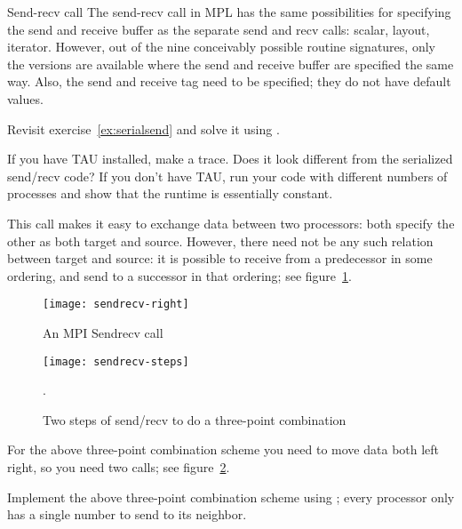\begin{mplnote}{Send-recv call}
  The send-recv call in \ac{MPL} has the same possibilities
  for specifying the send and receive buffer as the separate send and recv calls:
  scalar, layout, iterator. However, out of the nine conceivably possible
  routine signatures, only the versions are available where the send and receive buffer
  are specified the same way.
  Also, the send and receive tag need to be specified; they do not have default values.

\end{mplnote}

\begin{exercise}
  \label{ex:rightsendrecv}
  Revisit exercise~\ref{ex:serialsend} and solve it using
  .

  If you have TAU installed, make a trace. Does it look different
  from the serialized send/recv code? If you don't have TAU, run your
  code with different numbers of processes and show that the runtime
  is essentially constant.
\end{exercise}

This call makes it easy to exchange data between two processors: both
specify the other as both target and source. However, there need not
be any such relation between target and source: it is possible to
receive from a predecessor in some ordering, and send to a successor
in that ordering; see figure~\ref{fig:sendrecv}.

\begin{figure}[ht]
  \texttt{[image: sendrecv-right]}
  \caption{An MPI Sendrecv call}
  \label{fig:sendrecv}
\end{figure}

\begin{figure}[ht]
  \texttt{[image: sendrecv-steps]}
  \caption{Two steps of send/recv to do a three-point combination}
  \label{fig:sendrecv-steps}.
\end{figure}

For the above three-point combination scheme you need to move data
both left right, so you need two  calls;
see figure~\ref{fig:sendrecv-steps}.

\begin{exercise}
  \label{ex:3ptsendrecv}
  Implement the above three-point combination scheme using ;
  every processor only has a single number to send to its neighbor.
\end{exercise}

